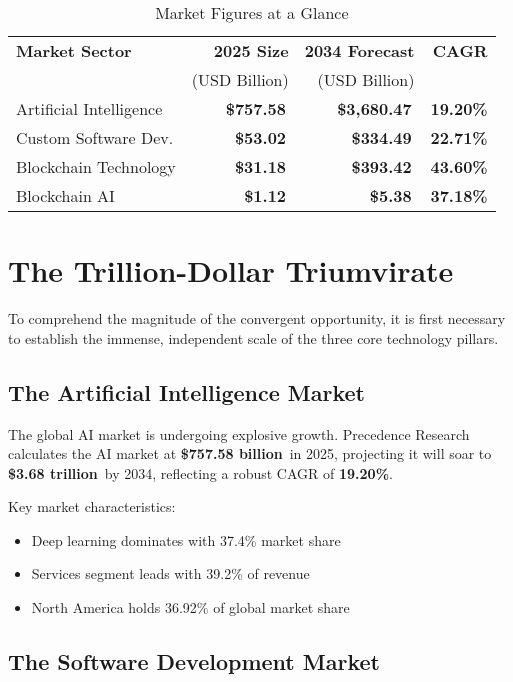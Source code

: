 \documentclass[11pt,a4paper]{report}
\newcommand{\marketvalue}[2]{\textcolor{accentgreen}{\textbf{\$#1}}\,\textcolor{darkgray}{#2}}
\newcommand{\cagr}[1]{\textcolor{primaryblue}{\textbf{#1\%}}}
\begin{document}
\begin{table}[h]
\centering
\caption{Market Figures at a Glance}
\begin{tabular}{lrrr}
\toprule
\textbf{Market Sector} & \textbf{2025 Size} & \textbf{2034 Forecast} & \textbf{CAGR} \\
& (USD Billion) & (USD Billion) & \\
\midrule
Artificial Intelligence & \marketvalue{757.58}{} & \marketvalue{3,680.47}{} & \cagr{19.20} \\
Custom Software Dev. & \marketvalue{53.02}{} & \marketvalue{334.49}{} & \cagr{22.71} \\
Blockchain Technology & \marketvalue{31.18}{} & \marketvalue{393.42}{} & \cagr{43.60} \\
Blockchain AI & \marketvalue{1.12}{} & \marketvalue{5.38}{} & \cagr{37.18} \\
\bottomrule
\end{tabular}
\end{table}

\chapter{The Trillion-Dollar Triumvirate}

To comprehend the magnitude of the convergent opportunity, it is first necessary to establish the immense, independent scale of the three core technology pillars.

\section{The Artificial Intelligence Market}

The global AI market is undergoing explosive growth. Precedence Research calculates the AI market at \marketvalue{757.58 billion}{} in 2025, projecting it will soar to \marketvalue{3.68 trillion}{} by 2034, reflecting a robust CAGR of \cagr{19.20}.

Key market characteristics:
\begin{itemize}
    \item Deep learning dominates with 37.4\% market share
    \item Services segment leads with 39.2\% of revenue
    \item North America holds 36.92\% of global market share
\end{itemize}

\section{The Software Development Market}
\end{document}
